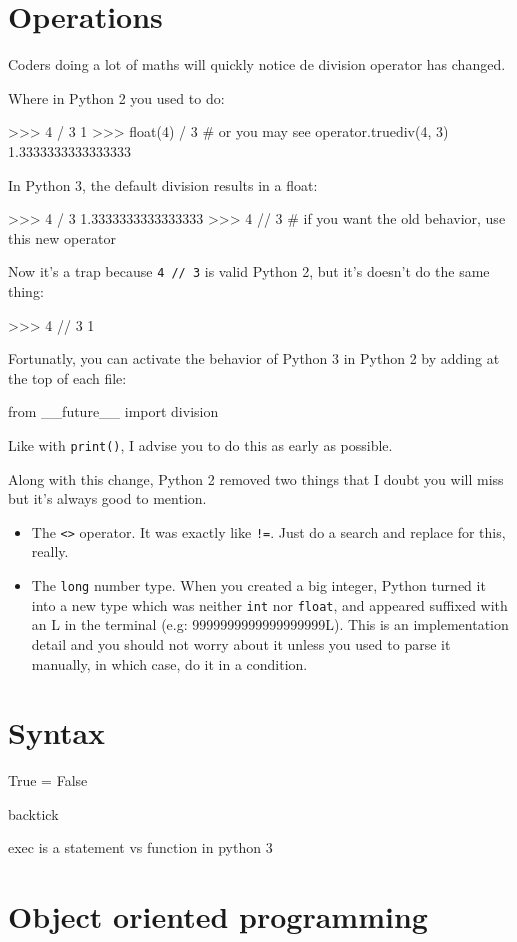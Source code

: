 \section{Operations}

Coders doing a lot of maths will quickly notice de division operator has changed.

Where in Python 2 you used to do:

\begin{py2}
>>> 4 / 3
1
>>> float(4) / 3  # or you may see operator.truediv(4, 3)
1.3333333333333333
\end{py2}

In Python 3, the default division results in a float:

\begin{py3}
>>> 4 / 3
1.3333333333333333
>>> 4 // 3  # if you want the old behavior, use this new operator
\end{py3}

Now it's a trap because \lstinline{4 // 3} is valid Python 2, but it's doesn't do the same thing:

\begin{py2}
>>> 4 // 3
1
\end{py2}

Fortunatly, you can activate the behavior of Python 3 in Python 2 by adding at the top of each file:

\begin{py2and3}
from __future__ import division
\end{py2and3}

Like with \lstinline{print()}, I advise you to do this as early as possible.

Along with this change, Python 2 removed two things that I doubt you will miss but it's always good to mention.

\begin{itemize}
    \item The \lstinline{<>} operator. It was exactly like \lstinline{!=}. Just do a search and replace for this, really.
    \item The \lstinline{long} number type. When you created a big integer, Python turned it into a new type which was neither \lstinline{int} nor \lstinline{float}, and appeared suffixed with an L in the terminal (e.g: 9999999999999999999L). This is an implementation detail and you should not worry about it unless you used to parse it manually, in which case, do it in a condition.
\end{itemize}


\section{Syntax}

True = False

backtick

exec is a statement vs function in python 3


\section{Object oriented programming}

